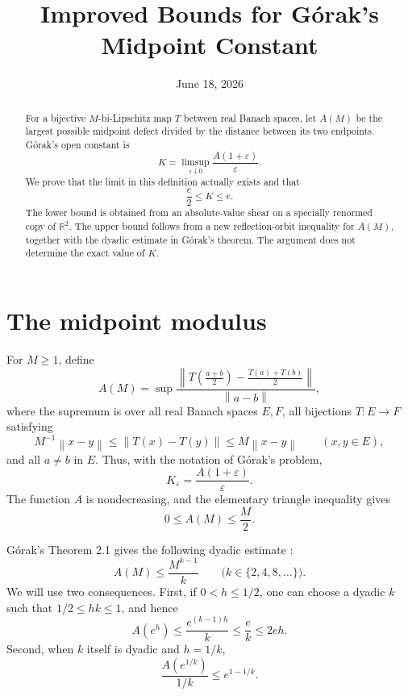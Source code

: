 \documentclass[11pt]{article}
\title{Improved Bounds for G\'orak's Midpoint Constant}
\author{}
\date{June 18, 2026}
\theoremstyle{remark}
\newcommand{\R}{\mathbb{R}}
\newcommand{\eps}{\varepsilon}
\newcommand{\norm}[1]{\left\lVert #1\right\rVert}
\begin{document}
\maketitle

\begin{abstract}
For a bijective $M$-bi-Lipschitz map $T$ between real Banach spaces, let
$A(M)$ be the largest possible midpoint defect divided by the distance between
its two endpoints.  G\'orak's open constant is
\[
 K=\limsup_{\eps\downarrow0}\frac{A(1+\eps)}{\eps}.
\]
We prove that the limit in this definition actually exists and that
\[
 \frac e2\le K\le e.
\]
The lower bound is obtained from an absolute-value shear on a specially
renormed copy of $\R^2$.  The upper bound follows from a new reflection-orbit
inequality for $A(M)$, together with the dyadic estimate in G\'orak's theorem.
The argument does not determine the exact value of $K$.
\end{abstract}

\section{The midpoint modulus}

For $M\ge1$, define
\begin{equation}\label{eq:def-A}
 A(M)=\sup
 \frac{
 \norm{T\left(\frac{a+b}{2}\right)-\frac{T(a)+T(b)}2}}
 {\norm{a-b}},
\end{equation}
where the supremum is over all real Banach spaces $E,F$, all bijections
$T:E\to F$ satisfying
\[
 M^{-1}\norm{x-y}\le \norm{T(x)-T(y)}\le M\norm{x-y}
 \qquad(x,y\in E),
\]
and all $a\ne b$ in $E$.  Thus, with the notation of G\'orak's problem,
\begin{equation}\label{eq:K-A}
 K_{\eps}=\frac{A(1+\eps)}{\eps}.
\end{equation}
The function $A$ is nondecreasing, and the elementary triangle inequality gives
\begin{equation}\label{eq:trivial-A}
 0\le A(M)\le \frac M2.
\end{equation}

G\'orak's Theorem 2.1 gives the following dyadic estimate
\cite{Gorak}:
\begin{equation}\label{eq:dyadic}
 A(M)\le \frac{M^{k-1}}{k}
 \qquad\bigl(k\in\{2,4,8,\ldots\}\bigr).
\end{equation}
We will use two consequences.  First, if $0<h\le 1/2$, one can choose a
dyadic $k$ such that $1/2\le hk\le1$, and hence
\begin{equation}\label{eq:local-linear}
 A(e^h)\le \frac{e^{(k-1)h}}k\le \frac e k\le 2eh.
\end{equation}
Second, when $k$ itself is dyadic and $h=1/k$,
\begin{equation}\label{eq:dyadic-subsequence}
 \frac{A(e^{1/k})}{1/k}\le e^{1-1/k}.
\end{equation}
\end{document}
